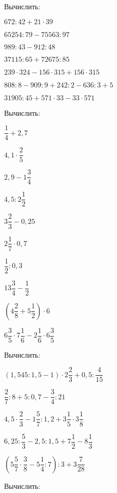 \begin{enumcols}[label=\textbf{\arabic*.}]
	\item Вычислить:
	\begin{enumcols}[itemcolumns=2]
		\item \( 672:42+21\cdot39 \)
		\item \( 65254:79-75563:97 \)
		\item \( 989:43-912:48 \)
		\item \( 37115:65+72675:85 \)
		\item \( 239\cdot324 - 156\cdot315 + 156\cdot315 \)
		\item \( 808:8-909:9+242:2-636:3+5 \)
		\item \( 31905:45+571\cdot33-33\cdot571 \)
	\end{enumcols}
	\item Вычислить:
	\begin{enumcols}[itemcolumns=3]
		\item \( \dfrac{1}{4}+2,7 \)
		\item \( 4,1\cdot\dfrac{2}{5} \)
		\item \( 2,9-1\dfrac{3}{4} \)
		\item \( 4,5:2\dfrac{1}{2} \)
		\item \( 3\dfrac{2}{3}-0,25 \)
		\item \( 2\dfrac{1}{7}\cdot0,7 \)
		\item \( \dfrac{1}{2}:0,3 \)
		\item \( 13\dfrac{3}{4}-\dfrac{1}{2} \)
		\item \( \left( 4\dfrac{2}{8}+5\dfrac{1}{2} \right)\cdot6 \)
		\item \( 6\dfrac{3}{5}\cdot7\dfrac{1}{6}-2\dfrac{1}{6}\cdot6\dfrac{3}{5} \)
	\end{enumcols}
	\item Вычислить:
	\begin{enumcols}[itemcolumns=2]
		\item \( (1,545:1,5-1)\cdot2\dfrac{2}{3}+0,5:\dfrac{4}{15} \)
		\item \( \dfrac{2}{7}:8+5:0,7-\dfrac{3}{4}:21 \)
		\item \( 4,5\cdot\dfrac{2}{3}-1\dfrac{5}{7}:1,2+3\dfrac{1}{5}\cdot3\dfrac{1}{8} \)
		\item \( 6,25:\dfrac{5}{3}-2,5:1,5+7\dfrac{1}{2}-8\dfrac{1}{3} \)
		\item \( \left( 5\dfrac{5}{7}\cdot\dfrac{3}{8}-5\dfrac{1}{4}:7 \right):3+3\dfrac{7}{28} \)
	\end{enumcols}
	\item Вычислить:

\end{enumcols}
